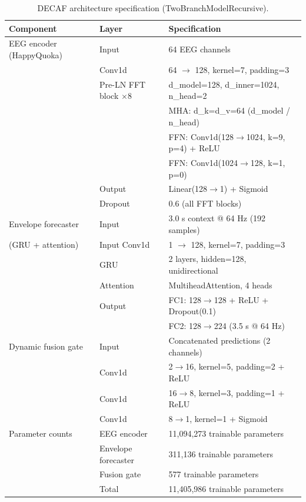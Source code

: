 \begin{table}[t]
\centering
\caption{DECAF architecture specification (TwoBranchModelRecursive).}
\label{tab:decaf_architecture}
\begin{tabular}{lll}
\toprule
\textbf{Component} & \textbf{Layer} & \textbf{Specification} \\
\midrule
EEG encoder (HappyQuoka) & Input & 64 EEG channels \\
 & Conv1d & 64 $\rightarrow$ 128, kernel=7, padding=3 \\
 & Pre-LN FFT block $\times 8$ & d\_model=128, d\_inner=1024, n\_head=2 \\
 &  & MHA: d\_k=d\_v=64 (d\_model / n\_head) \\
 &  & FFN: Conv1d(128$\rightarrow$1024, k=9, p=4) + ReLU \\
 &  & FFN: Conv1d(1024$\rightarrow$128, k=1, p=0) \\
 & Output & Linear(128$\rightarrow$1) + Sigmoid \\
 & Dropout & 0.6 (all FFT blocks) \\
\midrule
Envelope forecaster & Input & 3.0 s context @ 64 Hz (192 samples) \\
(GRU + attention) & Input Conv1d & 1 $\rightarrow$ 128, kernel=7, padding=3 \\
 & GRU & 2 layers, hidden=128, unidirectional \\
 & Attention & MultiheadAttention, 4 heads \\
 & Output & FC1: 128$\rightarrow$128 + ReLU + Dropout(0.1) \\
 &  & FC2: 128$\rightarrow$224 (3.5 s @ 64 Hz) \\
\midrule
Dynamic fusion gate & Input & Concatenated predictions (2 channels) \\
 & Conv1d & 2$\rightarrow$16, kernel=5, padding=2 + ReLU \\
 & Conv1d & 16$\rightarrow$8, kernel=3, padding=1 + ReLU \\
 & Conv1d & 8$\rightarrow$1, kernel=1 + Sigmoid \\
\midrule
Parameter counts & EEG encoder & 11,094,273 trainable parameters \\
 & Envelope forecaster & 311,136 trainable parameters \\
 & Fusion gate & 577 trainable parameters \\
 & Total & 11,405,986 trainable parameters \\
\bottomrule
\end{tabular}
\end{table}

